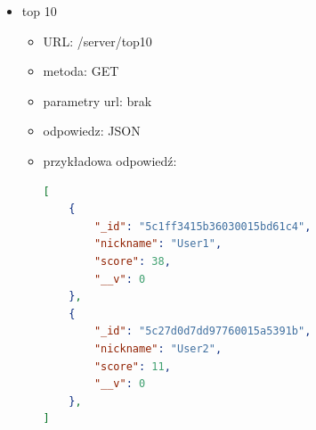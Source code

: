 \documentclass[12pt,a4paper]{article}
\begin{document}
\begin{itemize}
\begin{itemize}
        \item parametry url: brak
        \item parametry w ciele: nickname=[String] oraz score=[Number]
        \item przykładowe ciało zapytania:
                        \begin{lstlisting}[language=json,firstnumber=1]
{
  "nickname": "name",
  "score": 23
}
\end{lstlisting}
        \item odpowiedz: JSON
        \item przykładowa odpowiedź:
                \begin{lstlisting}[language=json,firstnumber=1]
{
    "success": true,
    "info": {
        "_id": "5c27d0d7dd97760015a5391b",
        "nickname": "Isur",
        "score": 11,
        "__v": 0
    }
}
\end{lstlisting}
    \end{itemize}
    \item top 10
    \begin{itemize}
        \item URL: /server/top10
        \item metoda: GET
        \item parametry url: brak
        \item odpowiedz: JSON
        \item przykładowa odpowiedź:
        \begin{lstlisting}[language=json,firstnumber=1]
[
    {
        "_id": "5c1ff3415b36030015bd61c4",
        "nickname": "User1",
        "score": 38,
        "__v": 0
    },
    {
        "_id": "5c27d0d7dd97760015a5391b",
        "nickname": "User2",
        "score": 11,
        "__v": 0
    },
]
\end{lstlisting}
    \end{itemize}
\end{itemize}
\clearpage
\end{document}
